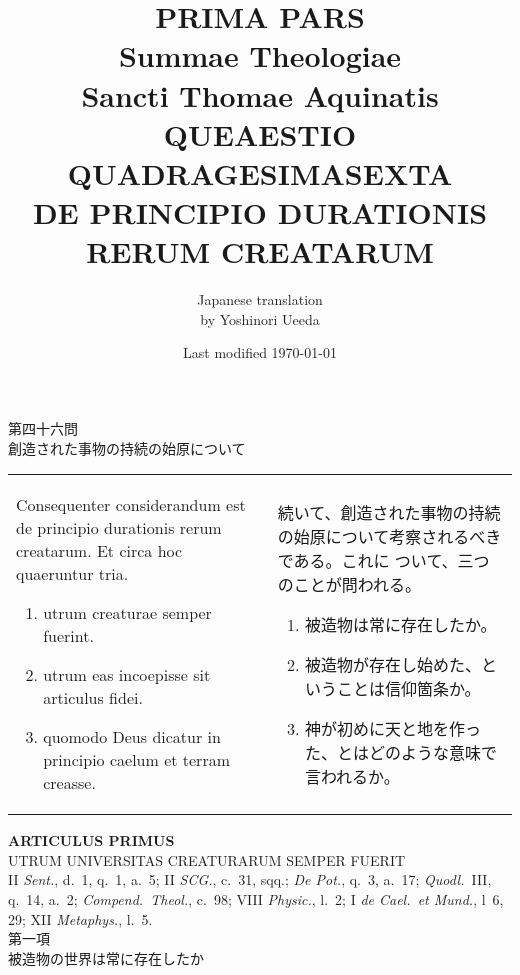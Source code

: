 \documentclass[10pt]{jsarticle} %
\title{{\bf PRIMA PARS}\\{\HUGE Summae Theologiae}\\Sancti Thomae
Aquinatis\\{\sffamily QUEAESTIO QUADRAGESIMASEXTA}\\DE PRINCIPIO
DURATIONIS RERUM CREATARUM}
\author{Japanese translation\\by Yoshinori {\sc Ueeda}}
\date{Last modified \today}
\begin{document}
\maketitle

\begin{center}
{\Large 第四十六問\\創造された事物の持続の始原について}
\end{center}

\begin{longtable}{p{21em}p{21em}}

Consequenter considerandum est de principio durationis rerum
 creatarum. Et circa hoc quaeruntur tria. 

\begin{enumerate}
 \item utrum creaturae semper fuerint. 
 \item utrum eas incoepisse sit articulus fidei. 
 \item quomodo Deus dicatur in principio caelum et terram creasse.
\end{enumerate}
&

続いて、創造された事物の持続の始原について考察されるべきである。これに
ついて、三つのことが問われる。
\begin{enumerate}
 \item 被造物は常に存在したか。
 \item 被造物が存在し始めた、ということは信仰箇条か。
 \item 神が初めに天と地を作った、とはどのような意味で言われるか。
\end{enumerate}

\end{longtable}


\newpage
{}

\begin{center}
 {\Large {\bf ARTICULUS PRIMUS\\ 
}}
 {\large UTRUM UNIVERSITAS CREATURARUM SEMPER FUERIT}\\
{\footnotesize II {\itshape Sent.}, d.~1, q.~1, a.~5; II {\itshape
 SCG.}, c.~31, sqq.; {\itshape De Pot.}, q.~3, a.~17; {\itshape
 Quodl.}~III, q.~14, a.~2; {\itshape Compend.~Theol.}, c.~98; VIII
 {\itshape Physic.}, l.~2; I {\itshape de Cael.~et Mund.}, l~6, 29; XII
 {\itshape Metaphys.}, l.~5.}\\
{\Large 第一項\\
被造物の世界は常に存在したか}
\end{center}
\end{document}
